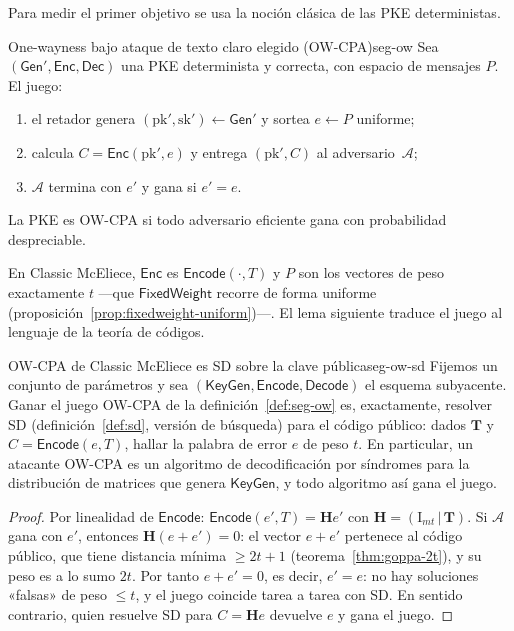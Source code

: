 \documentclass[11pt,a4paper,oneside]{report}
\newcommand{\Hmat}{\mathbf{H}}          %
\newcommand{\Tmat}{\mathbf{T}}          %
\begin{document}
Para medir el primer objetivo se usa la noción clásica de las PKE
deterministas.

\begin{definicion}{One-wayness bajo ataque de texto claro elegido (OW-CPA)}{seg-ow}
Sea $(\textsf{Gen}',\textsf{Enc},\textsf{Dec})$ una PKE determinista
y correcta, con espacio de mensajes $P$. El juego:
\begin{enumerate}[leftmargin=1.8em,itemsep=2pt]
  \item el retador genera
        $(\mathrm{pk}',\mathrm{sk}')\leftarrow\textsf{Gen}'$ y sortea
        $e\leftarrow P$ uniforme;
  \item calcula $C=\textsf{Enc}(\mathrm{pk}',e)$ y entrega
        $(\mathrm{pk}',C)$ al adversario~$\mathcal{A}$;
  \item $\mathcal{A}$ termina con $e'$ y gana si $e'=e$.
\end{enumerate}
La PKE es OW-CPA si todo adversario eficiente gana con probabilidad
despreciable.
\end{definicion}

En Classic McEliece, $\textsf{Enc}$ es $\textsf{Encode}(\cdot,T)$ y
$P$ son los vectores de peso exactamente $t$ ---que
$\textsf{FixedWeight}$ recorre de forma uniforme
(proposición~\ref{prop:fixedweight-uniform})---. El lema siguiente
traduce el juego al lenguaje de la teoría de códigos.

\begin{lema}{OW-CPA de Classic McEliece es SD sobre la clave pública}{seg-ow-sd}
Fijemos un conjunto de parámetros y sea
$(\textsf{KeyGen},\textsf{Encode},\textsf{Decode})$ el esquema
subyacente. Ganar el juego OW-CPA de la definición~\ref{def:seg-ow}
es, exactamente, resolver SD (definición~\ref{def:sd}, versión de
búsqueda) para el código público: dados $\Tmat$ y
$C=\textsf{Encode}(e,T)$, hallar la palabra de error $e$ de peso $t$.
En particular, un atacante OW-CPA es un algoritmo de decodificación
por síndromes para la distribución de matrices que genera
$\textsf{KeyGen}$, y todo algoritmo así gana el juego.
\end{lema}

\begin{proof}
Por linealidad de $\textsf{Encode}$: $\textsf{Encode}(e',T)=\Hmat e'$
con $\Hmat=(\mathrm{I}_{mt}\,|\,\Tmat)$. Si $\mathcal{A}$ gana con
$e'$, entonces $\Hmat(e+e')=0$: el vector $e+e'$ pertenece al código
público, que tiene distancia mínima $\ge 2t+1$
(teorema~\ref{thm:goppa-2t}), y su peso es a lo sumo $2t$. Por tanto
$e+e'=0$, es decir, $e'=e$: no hay soluciones «falsas» de peso
$\le t$, y el juego coincide tarea a tarea con SD. En sentido
contrario, quien resuelve SD para $C=\Hmat e$ devuelve $e$ y gana el
juego.
\end{proof}
\end{document}

